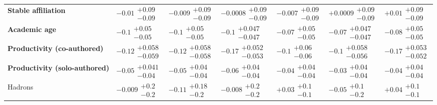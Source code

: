 \begin{table}[H]
\begin{tabular}{lllllll}
\textbf{Stable affiliation} & $-0.01\substack{+0.09 \\ -0.09}$ & $-0.009\substack{+0.09 \\ -0.09}$ & $-0.0008\substack{+0.09 \\ -0.09}$ & $-0.007\substack{+0.09 \\ -0.09}$ & $+0.0009\substack{+0.09 \\ -0.09}$ & $+0.01\substack{+0.09 \\ -0.09}$ \\
\textbf{Academic age} & $\bm{-0.1}\substack{+0.05 \\ -0.05}$ & $\bm{-0.1}\substack{+0.05 \\ -0.05}$ & $\bm{-0.1}\substack{+0.047 \\ -0.047}$ & $\bm{-0.07}\substack{+0.05 \\ -0.05}$ & $\bm{-0.07}\substack{+0.047 \\ -0.047}$ & $\bm{-0.08}\substack{+0.05 \\ -0.05}$ \\
\textbf{Productivity (co-authored)} & $\bm{-0.12}\substack{+0.058 \\ -0.059}$ & $\bm{-0.12}\substack{+0.058 \\ -0.058}$ & $\bm{-0.17}\substack{+0.052 \\ -0.053}$ & $\bm{-0.1}\substack{+0.06 \\ -0.06}$ & $\bm{-0.1}\substack{+0.058 \\ -0.056}$ & $\bm{-0.17}\substack{+0.053 \\ -0.052}$ \\
\textbf{Productivity (solo-authored)} & $\bm{-0.05}\substack{+0.041 \\ -0.04}$ & $\bm{-0.05}\substack{+0.04 \\ -0.04}$ & $\bm{-0.06}\substack{+0.04 \\ -0.04}$ & $-0.04\substack{+0.04 \\ -0.04}$ & $-0.03\substack{+0.04 \\ -0.04}$ & $\bm{-0.04}\substack{+0.04 \\ -0.04}$ \\
\hline Hadrons & $-0.009\substack{+0.2 \\ -0.2}$ & $-0.11\substack{+0.18 \\ -0.2}$ & $-0.008\substack{+0.2 \\ -0.2}$ & $+0.03\substack{+0.1 \\ -0.1}$ & $-0.05\substack{+0.1 \\ -0.2}$ & $+0.04\substack{+0.1 \\ -0.1}$ \\

\end{tabular}
\end{table}
